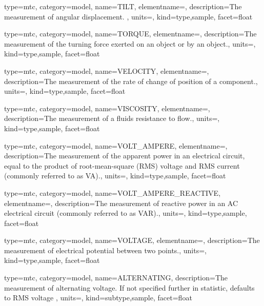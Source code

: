{
  type=mtc,
  category=model,
  name={TILT},
  elementname=,
  description={The measurement of angular displacement. },
  units=,
  kind={type,sample},
  facet={\gls{float}}
}


{
  type=mtc,
  category=model,
  name={TORQUE},
  elementname=,
  description={The measurement of the turning force exerted on an object or by an object.},
  units=,
  kind={type,sample},
  facet={\gls{float}}
}


{
  type=mtc,
  category=model,
  name={VELOCITY},
  elementname=,
  description={The measurement of the rate of change of position of a \gls{component}.},
  units=,
  kind={type,sample},
  facet={\gls{float}}
}


{
  type=mtc,
  category=model,
  name={VISCOSITY},
  elementname=,
  description={The measurement of a fluids resistance to flow.},
  units=,
  kind={type,sample},
  facet={\gls{float}}
}


{
  type=mtc,
  category=model,
  name={VOLT\_AMPERE},
  elementname=,
  description={The measurement of the apparent power in an electrical circuit, equal to the product of root-mean-square (RMS) voltage and RMS current (commonly referred to as VA).},
  units=,
  kind={type,sample},
  facet={\gls{float}}
}


{
  type=mtc,
  category=model,
  name={VOLT\_AMPERE\_REACTIVE},
  elementname=,
  description={The measurement of reactive power in an AC electrical circuit (commonly referred to as VAR).},
  units=,
  kind={type,sample},
  facet={\gls{float}}
}


{
  type=mtc,
  category=model,
  name={VOLTAGE},
  elementname=,
  description={The measurement of electrical potential between two points.},
  units=,
  kind={type,sample},
  facet={\gls{float}}
}


{
  type=mtc,
  category=model,
  name={ALTERNATING},
  description={The measurement of alternating voltage.   If not specified further in statistic, defaults to RMS voltage  },
  units=,
  kind={subtype,sample},
  facet={\gls{float}}
}


